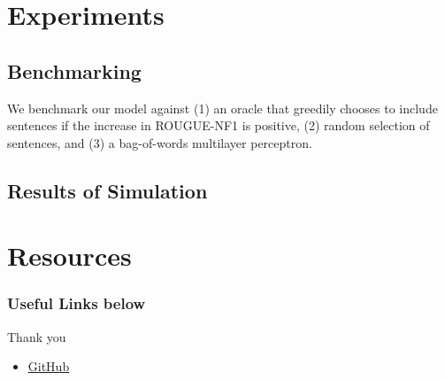 \documentclass[]{beamer}
\begin{document}
	
\section{Experiments}
	\subsection{Benchmarking}
		\begin{frame}
		We benchmark our model against (1) an oracle that greedily chooses to include sentences if the increase in ROUGUE-NF1 is positive,  (2) random selection of sentences,  and (3) a bag-of-words multilayer perceptron.
		\end{frame}

	\subsection{Results of Simulation}
		\begin{frame}
		
		\end{frame}


\section{Resources}
\begin{frame}
	\frametitle{Useful Links below}
	Thank you
	\begin{itemize}
	\item<1-> \href{https://github.com/franciscojavierarceo/DQN-Event-Summarization}{GitHub}
	\end{itemize}
\end{frame}


\end{document}
